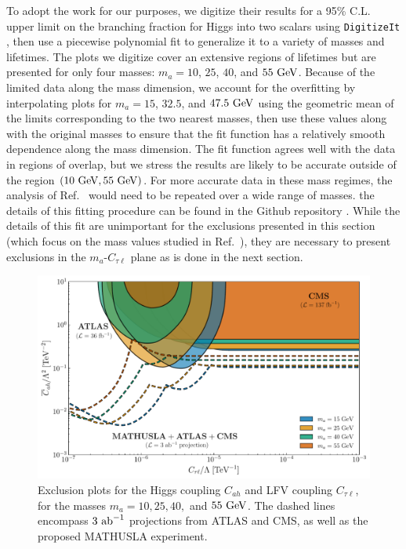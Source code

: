 To adopt the work for our purposes, we digitize their results for a 95\% C.L. upper limit on the branching fraction for Higgs into two scalars using \verb|DigitizeIt| \cite{DigitizeIt}, then use a piecewise polynomial fit to generalize it to a variety of masses and lifetimes. The plots we digitize cover an extensive regions of lifetimes but are presented for only four masses: $m_a = 10$, $25$, $40$, and $55~{\rm GeV}$. Because of the limited data along the mass dimension, we account for the overfitting by interpolating plots for $m_a = 15$, $32.5$, and $47.5~{\rm GeV}$ using the geometric mean of the limits corresponding to the two nearest masses, then use these values along with the original masses to ensure that the fit function has a relatively smooth dependence along the mass dimension. The fit function agrees well with the data in regions of overlap, but we stress the results are likely to be accurate outside of the region $(10~{\rm GeV}, 55~{\rm GeV})$. For more accurate data in these mass regimes, the analysis of Ref.~\cite{ATLAS:2022zhj} would need to be repeated over a wide range of masses. the details of this fitting procedure can be found in the Github repository \cite{MarcarelliGithub2021}. While the details of this fit are unimportant for the exclusions presented in this section (which focus on the mass values studied in Ref.~\cite{ATLAS:2022zhj}), they are necessary to present exclusions in the $m_a$-$C_{\tau\ell}$ plane as is done in the next section.
\begin{figure}[t!]
    \centering
    \includegraphics[width=\linewidth]{figures/chapter5/Cah_vs_Ctl_limits.pdf}
    \caption[Constraints on LFV ALP models at CMS, ATLAS, and MATHUSLA in the Higgs-ALP and lepton-ALP coupling plane.]{Exclusion plots for the Higgs coupling $C_{ah}$ and LFV coupling $C_{\tau \ell}$, for the masses $m_a = 10, 25, 40,$ and $55~{\rm GeV}$. The dashed lines encompass $3~{\rm ab}^{-1}$ projections from ATLAS and CMS, as well as the proposed MATHUSLA experiment.}
    \label{fig:Cah_Ctl_exclusion_all}
\end{figure}

